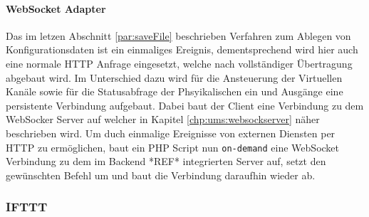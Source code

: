\paragraph{WebSocket Adapter}
Das im letzen Abschnitt \ref {par:saveFile} beschrieben Verfahren zum Ablegen von Konfigurationsdaten ist ein einmaliges Ereignis, dementsprechend wird hier auch eine normale HTTP Anfrage eingesetzt, welche nach vollständiger Übertragung abgebaut wird. Im Unterschied dazu wird für die Ansteuerung der Virtuellen Kanäle sowie für die Statusabfrage der Phsyikalischen ein und Ausgänge eine persistente Verbindung aufgebaut. Dabei baut der Client eine Verbindung zu dem WebSocker Server auf welcher in Kapitel \ref{chp:ums:websockserver} näher beschrieben wird. Um duch einmalige Ereignisse von externen Diensten per HTTP zu ermöglichen, baut ein PHP Script nun \texttt{on-demand} eine WebSocket Verbindung zu dem im Backend *REF* integrierten Server auf, setzt den gewünschten Befehl um und baut die Verbindung daraufhin wieder ab. 

\subsubsection{IFTTT}




\clearpage


